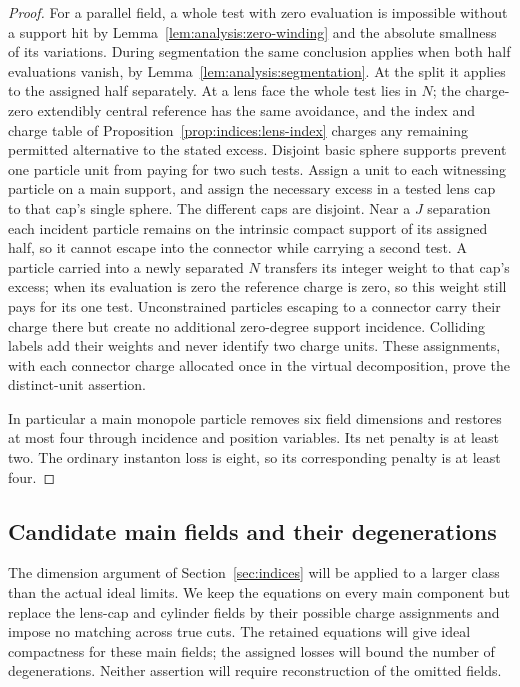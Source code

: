 \begin{proof}
For a parallel field, a whole test with zero evaluation is impossible
without a support hit by Lemma~\ref{lem:analysis:zero-winding} and the
absolute smallness of its variations.  During segmentation the same
conclusion applies when both half evaluations vanish, by
Lemma~\ref{lem:analysis:segmentation}.  At the split it applies to the
assigned half separately.  At a lens face the whole test lies in $N$;
the charge-zero extendibly central reference has the same avoidance,
and the index and charge table of
Proposition~\ref{prop:indices:lens-index} charges any remaining permitted
alternative to the stated excess.  Disjoint basic sphere supports
prevent one particle unit from paying for two such tests.  Assign a
unit to each witnessing particle on a main support, and assign the
necessary excess in a tested lens cap to that cap's single sphere.
The different caps are disjoint.  Near a $J$ separation each incident
particle remains on the intrinsic compact support of its assigned
half, so it cannot escape into the connector while carrying a second
test.  A particle carried into a newly separated $N$ transfers its
integer weight to that cap's excess; when its evaluation is zero the
reference charge is zero, so this weight still pays for its one test.
Unconstrained particles escaping to a connector carry their charge
there but create no additional zero-degree support incidence.
Colliding labels add their weights and never identify two charge units.
These assignments, with each connector charge allocated once in the
virtual decomposition, prove the distinct-unit assertion.

In particular a main monopole particle removes six field dimensions
and restores at most four through incidence and position variables.
Its net penalty is at least two.  The ordinary instanton loss is eight,
so its corresponding penalty is at least four.
\end{proof}

\subsection{Candidate main fields and their degenerations}
\label{subsec:analysis:candidates}

The dimension argument of Section~\ref{sec:indices} will be applied to
a larger class than the actual ideal limits.  We keep the equations on
every main component but replace the lens-cap and cylinder fields by their
possible charge assignments and impose no matching across true cuts.
The retained equations will give ideal compactness for these main fields;
the assigned losses will bound the number of degenerations.  Neither
assertion will require reconstruction of the omitted fields.

